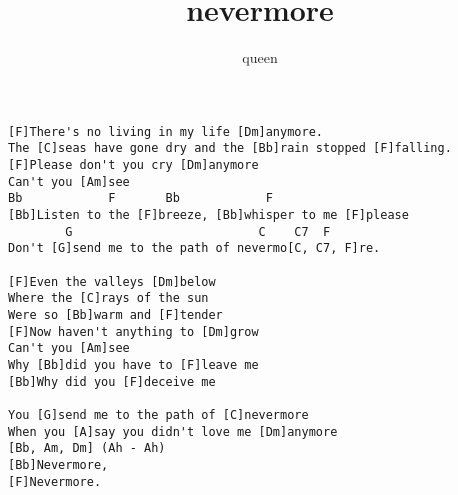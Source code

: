 \author{queen}
\title{nevermore}
\maketitle
\begin{verbatim}
[F]There's no living in my life [Dm]anymore.
The [C]seas have gone dry and the [Bb]rain stopped [F]falling.
[F]Please don't you cry [Dm]anymore
Can't you [Am]see
Bb            F       Bb            F
[Bb]Listen to the [F]breeze, [Bb]whisper to me [F]please
        G                          C    C7  F
Don't [G]send me to the path of nevermo[C, C7, F]re.

[F]Even the valleys [Dm]below
Where the [C]rays of the sun
Were so [Bb]warm and [F]tender
[F]Now haven't anything to [Dm]grow
Can't you [Am]see
Why [Bb]did you have to [F]leave me
[Bb]Why did you [F]deceive me

You [G]send me to the path of [C]nevermore
When you [A]say you didn't love me [Dm]anymore
[Bb, Am, Dm] (Ah - Ah)
[Bb]Nevermore,
[F]Nevermore.
\end{verbatim}
